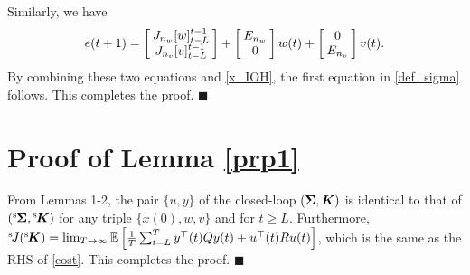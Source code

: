 \documentclass[preprint,5p,times,twocolumn]{elsarticle}
\newcommand{\bm}[1]{{\mbox{\boldmath $#1$}}}
\def\rms{{}^{\rm s}\hspace{-0.2mm}}
\def\rmsK{{}^{\rm s}\hspace{-0.4mm}}
\def\rmsJ{{}^{\rm s}\hspace{-0.5mm}}
\def\H{\hspace{-1.0mm}}
\def\qed{\hfill $\blacksquare$}
\begin{document}
Similarly, we have 
\begin{align}
 e(t+1) = \left[\H \begin{array}{c}
J_{n_w}[w]^{t-1}_{t-L} \\
J_{n_v}[v]^{t-1}_{t-L} 
\end{array}
 \H\right] + \left[\H\begin{array}{c}
E_{n_w} \\ 0
\end{array}
 \H\right] w(t) + \left[\H\begin{array}{c}
 0 \\ E_{n_v}
\end{array}
 \H\right] v(t). \nonumber 
\end{align}
By combining these two equations and \eqref{x_IOH}, the first equation in \eqref{def_sigma} follows. This completes the proof.
\qed

\section{Proof of Lemma \ref{prp1}}\label{prf_lem3}
From Lemmas 1-2, the pair $\{u,y\}$ of the closed-loop  $({\bm \Sigma}, {\bm K})$ is identical to that of $(\rms {\bm \Sigma}, \rmsK {\bm K})$ for any triple $\{x(0), w, v\}$ and for $t \geq L$. Furthermore, 
$\rmsJ J(\rmsK {\bm K}) = \lim_{T \rightarrow \infty} \mathbb E \left[\frac{1}{T} \sum_{t = L}^{T} y^{\top}(t)Qy(t) + u^{\top}(t)Ru(t) \right]$, which is the same as the RHS of \eqref{cost}. This completes the proof. 
\qed
\end{document}
